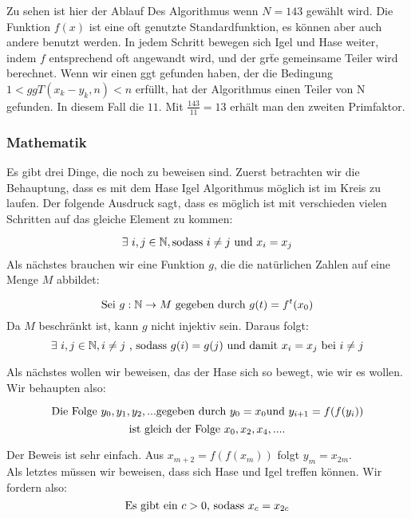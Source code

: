 	\noindent Zu sehen ist hier der Ablauf Des Algorithmus wenn $N=143$ gew\"ahlt wird. 
	Die Funktion $f(x)$ ist eine oft genutzte Standardfunktion, es k\"onnen aber auch andere benutzt werden. In jedem Schritt bewegen sich Igel und Hase weiter, indem $f$ entsprechend oft angewandt wird, und der gr\"te gemeinsame Teiler wird berechnet. Wenn wir einen ggt gefunden haben, der die Bedingung $1 < ggT(x_k - y_k, n)< n$ erf\"ullt, hat der Algorithmus einen Teiler von N gefunden. In diesem Fall die $11$.
 	Mit $\frac{143}{11}=13$ erh\"alt man den zweiten Primfaktor. 

 
 	\subsubsection{Mathematik}
 	\label{sec:pollardBeweis}
 	
 	Es gibt drei Dinge, die noch zu beweisen sind. Zuerst betrachten wir die Behauptung, dass es mit dem Hase Igel Algorithmus m\"oglich ist im Kreis zu laufen. Der folgende Ausdruck sagt, dass es m\"oglich ist mit verschieden vielen Schritten auf das gleiche Element zu kommen:
 	
 	\[\exists \ i,j \in \mathbb{N}, \textnormal{sodass } i \not= j \textnormal{ und } x_i = x_j \]
	Als n\"achstes brauchen wir eine Funktion $g$, die die nat\"urlichen Zahlen auf eine Menge $M$ abbildet:
	
	\[ \textnormal{Sei } g:\mathbb{N} \rightarrow M \ \textnormal{gegeben durch} \ g(t)=f^t(x_0)\]
	Da $M$  beschr\"ankt ist, kann $g$ nicht injektiv sein. Daraus folgt:\\
	
	\[\exists \ i,j \in \mathbb{N}, i\not=j \ \textnormal{, sodass } g(i)=g(j) \textnormal{ und damit } x_i=x_j \textnormal{ bei } i\not=j\] 
	
	\noindent Als n\"achstes wollen wir beweisen, das der Hase sich so bewegt, wie wir es wollen. Wir behaupten also:
 
 	\[\textnormal{Die Folge }y_0, y_1, y_2,... \textnormal{gegeben durch }y_0=x_0 \textnormal{und }y_{i+1}=f(f(y_i))\] \[ \textnormal{ist gleich der Folge }x_0,x_2,x_4,....\]
 	
 	\noindent Der Beweis ist sehr einfach. Aus $x_{m+2}=f(f(x_m))$ folgt $y_m = x_{2m}$.\\
 	
 	\noindent Als letztes m\"ussen wir beweisen, dass sich Hase und Igel treffen k\"onnen. Wir fordern also:
 		\[\textnormal{Es gibt ein }c>0 \textnormal{, sodass }x_c=x_{2c}\]
 
